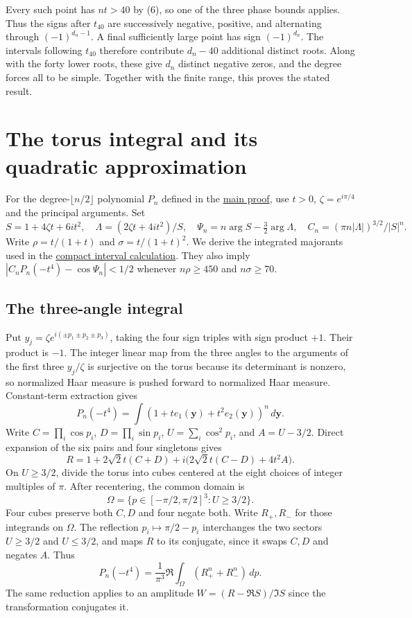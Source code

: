 \documentclass[11pt]{article}
\begin{document}
Every such point has $nt>40$ by (6), so one of the three phase bounds applies. Thus the signs after $t_{40}$ are successively negative, positive, and alternating through $(-1)^{d_n-1}$. A final sufficiently large point has sign $(-1)^{d_n}$. The intervals following $t_{40}$ therefore contribute $d_n-40$ additional distinct roots. Along with the forty lower roots, these give $d_n$ distinct negative zeros, and the degree forces all to be simple. Together with the finite range, this proves the stated result.

\section{The torus integral and its quadratic approximation}
\label{sec:central}

For the degree-$\lfloor n/2\rfloor$ polynomial $P_n$ defined in the \hyperref[sec:proof]{main proof}, use $t>0$, $\zeta=e^{i\pi/4}$ and the principal arguments. Set
\[
S=1+4\zeta t+6it^2,\quad \Lambda=(2\zeta t+4it^2)/S,\quad
\Psi_n=n\arg S-\tfrac32\arg\Lambda,\quad C_n=(\pi n|\Lambda|)^{3/2}/|S|^n.
\]
Write $\rho=t/(1+t)$ and $\sigma=t/(1+t)^2$. We derive the integrated majorants used in the \hyperref[sec:the-compact-interval]{compact interval calculation}. They also imply $|C_n P_n(-t^4)-\cos\Psi_n|<1/2$ whenever $n\rho\ge450$ and $n\sigma\ge70$.

\subsection{The three-angle integral}
\label{sec:the-three-angle-integral}

Put $y_j=\zeta e^{i(\pm p_1\pm p_2\pm p_3)}$, taking the four sign triples with sign product $+1$. Their product is $-1$. The integer linear map from the three angles to the arguments of the first three $y_j/\zeta$ is surjective on the torus because its determinant is nonzero, so normalized Haar measure is pushed forward to normalized Haar measure. Constant-term extraction gives
\[
P_n(-t^4)=\int (1+t e_1(\mathbf y)+t^2 e_2(\mathbf y))^n\,d\mathbf y .
\]
Write $C=\prod_i\cos p_i$, $D=\prod_i\sin p_i$, $U=\sum_i\cos^2p_i$, and $A=U-3/2$. Direct expansion of the six pairs and four singletons gives
\[
R=1+2\sqrt2t(C+D)+i\big(2\sqrt2t(C-D)+4t^2A\big).
\]
On $U\ge3/2$, divide the torus into cubes centered at the eight choices of integer multiples of $\pi$. After recentering, the common domain is
\[
\Omega=\{p\in[-\pi/2,\pi/2]^3: U\ge3/2\}.
\]
Four cubes preserve both $C,D$ and four negate both. Write $R_+,R_-$ for those integrands on $\Omega$. The reflection $p_i\mapsto\pi/2-p_i$ interchanges the two sectors $U\ge3/2$ and $U\le3/2$, and maps $R$ to its conjugate, since it swaps $C,D$ and negates $A$. Thus
\[
P_n(-t^4)=\frac{1}{\pi^3}\Re\int_\Omega (R_+^n+R_-^n)\,dp.
\]
The same reduction applies to an amplitude $W=(R-\Re S)/\Im S$ since the transformation conjugates it.
\end{document}
